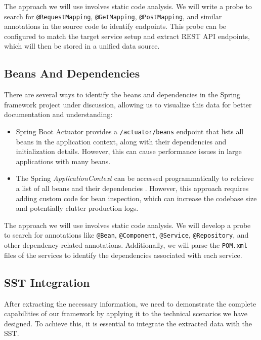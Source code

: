 The approach we will use involves static code analysis. We will write a probe to search for \texttt{@RequestMapping}, \texttt{@GetMapping}, \texttt{@PostMapping}, and similar annotations in the source code to identify endpoints. This probe can be configured to match the target service setup and extract REST API endpoints, which will then be stored in a unified data source.

\subsection{Beans And Dependencies}

There are several ways to identify the beans and dependencies in the Spring framework project under discussion, allowing us to visualize this data for better documentation and understanding:

\begin{itemize}
    \item Spring Boot Actuator provides a \texttt{/actuator/beans} endpoint that lists all beans in the application context, along with their dependencies and initialization details. However, this can cause performance issues in large applications with many beans.
    \item The Spring \textit{ApplicationContext} can be accessed programmatically to retrieve a list of all beans and their dependencies \citep{baeldung_applicationcontext}. However, this approach requires adding custom code for bean inspection, which can increase the codebase size and potentially clutter production logs.
\end{itemize}

The approach we will use involves static code analysis. We will develop a probe to search for annotations like \texttt{@Bean}, \texttt{@Component}, \texttt{@Service}, \texttt{@Repository}, and other dependency-related annotations. Additionally, we will parse the \texttt{POM.xml} files of the services to identify the dependencies associated with each service.

\subsection{SST Integration}

After extracting the necessary information, we need to demonstrate the complete capabilities of our framework by applying it to the technical scenarios we have designed. To achieve this, it is essential to integrate the extracted data with the SST.

